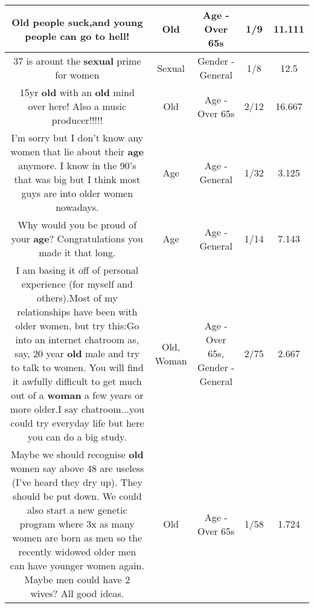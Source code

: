 \documentclass[11pt]{article}
\newlength\mylength
\begin{document}
\begin{center}
\begin{longtable}{|C{.65\mylength}|C{.30\mylength}|C{.12\mylength}|C{.12\mylength}|C{.12\mylength}|}
  \small Old people suck,and young people can go to hell!\normalsize   & Old & Age - Over 65s & 1/9 & 11.111 \\  \hline
  \small 37 is arount the \textbf{sexual} prime for women\normalsize   & Sexual & Gender - General & 1/8 & 12.5 \\  \hline
  \small 15yr \textbf{old} with an \textbf{old} mind over here! Also a music producer!!!!!\normalsize   & Old & Age - Over 65s & 2/12 & 16.667 \\  \hline
  \small I'm sorry but I don't know any women that lie about their \textbf{age} anymore. I know in the 90's that was big but I think most guys are into older women nowadays.\normalsize   & Age & Age - General & 1/32 & 3.125 \\  \hline
  \small Why would you be proud of your \textbf{age}? Congratulations you made it that long.\normalsize   & Age & Age - General & 1/14 & 7.143 \\  \hline
  \small I am basing it off of personal experience (for myself and others).Most of my relationships have been with older women, but try this:Go into an internet chatroom as, say, 20 year \textbf{old} male and try to talk to women. You will find it awfully difficult to get much out of a \textbf{woman} a few years or more older.I say chatroom...you could try everyday life but here you can do a big study.\normalsize   & Old, Woman & Age - Over 65s, Gender - General & 2/75 & 2.667 \\  \hline
  \small Maybe we should recognise \textbf{old} women say above 48 are useless (I've heard they dry up). They should be put down. We could also start a new genetic program where 3x as many women are born as men so the recently widowed older men can have younger women again. Maybe men could have 2 wives? All good ideas.\normalsize   & Old & Age - Over 65s & 1/58 & 1.724 \\  \hline

\end{longtable}
\end{center}
\end{document}
